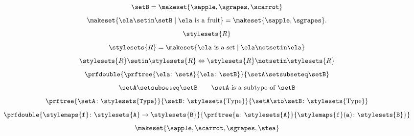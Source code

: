 {\begin{forslides}
\begin{equation}
            \label{eq:stat_4_session1_22}
            \setB=\makeset{\sapple, \sgrapes, \scarrot}
        \end{equation}
        \begin{equation}
            \label{eq:stat_5_session1_22}
            \makeset{ \ela \setin\setB \mid \ela \text{ is a fruit} } = \makeset{ \sapple, \sgrapes }.
        \end{equation}
        \begin{equation}
            \label{eq:russel_session1_22}
            \stylesets{R}
        \end{equation}
        \begin{equation}
            \label{eq:russel_2_session1_22}
            \stylesets{R}=\makeset{\ela \text{ is a set}\mid \ela \notsetin \ela}
        \end{equation}
        \begin{equation}
            \label{eq:russel_3_session1_22}
            \stylesets{R} \setin \stylesets{R} \Leftrightarrow \stylesets{R} \notsetin \stylesets{R}
        \end{equation}
        \begin{equation}
            \label{eq:types_session1_22}
            \prfdouble{
                \prftree{\ela \colon \setA}{\ela \colon \setB}}{\setA \setsubseteq \setB}
        \end{equation}
        \begin{equation}
            \label{eq:types_2_session1_22}
            \setA \setsubseteq \setB \qquad \setA \text{ is a subtype of }\setB
        \end{equation}
        \begin{equation}
            \label{eq:types_3_session1_22}
            \prftree{\setA\colon \stylesets{\texttt{Type}}}{\setB\colon \stylesets{\text{Type}}}{{\setA \sto \setB \colon \stylesets{\text{Type}}}}
        \end{equation}
        \begin{equation}
            \label{eq:types_4_session1_22}
            \prfdouble{
                \stylemaps{\texttt{f}}\colon \stylesets{\texttt{A}}\to \stylesets{\texttt{B}}}{\prftree{\texttt{a}\colon \stylesets{\texttt{A}}}{\stylemaps{\texttt{f}}(\texttt{a})\colon \stylesets{\texttt{B}}}}
        \end{equation}
        \begin{equation}
            \label{eq:1_session1_22}
            \makeset{\sapple,\scarrot,\sgrapes,\stea}
        \end{equation}

\end{forslides}}
